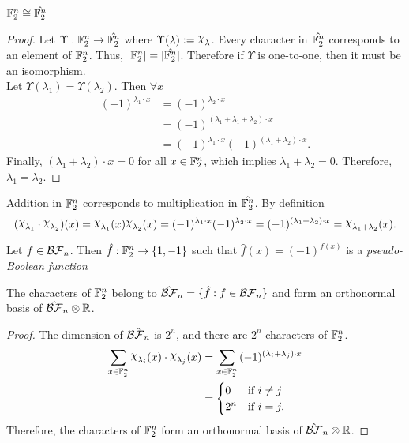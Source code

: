 \begin{lemma}
  $\mathbb{F}_2^n\cong\hat{\mathbb{F}_2^n}$
\end{lemma}

\begin{proof}
  \par Let $\Upsilon:\mathbb{F}_2^n\rightarrow\hat{\mathbb{F}_2^n}$ where
  $\Upsilon(\lambda):=\Chi_\lambda$.
	Every character in $\hat{\mathbb{F}_2^n}$ corresponds to an element of
  $\mathbb{F}_2^n$. Thus, $\lvert\mathbb{F}_2^n\rvert=\lvert\hat{\mathbb{F}_2^n}\rvert$.
  Therefore if $\Upsilon$ is one-to-one, then it must be an isomorphism.\\
	Let $\Upsilon(\lambda_1)=\Upsilon(\lambda_2)$. Then $\forall x$
	\begin{align*}
		(-1)^{\lambda_1\cdot x}
      &=(-1)^{\lambda_2\cdot x}\\
		  &=(-1)^{(\lambda_1+\lambda_1+\lambda_2)\cdot x}\\
      &=(-1)^{\lambda_1\cdot x}(-1)^{(\lambda_1+\lambda_2)\cdot x}.
	\end{align*}
	Finally, $(\lambda_1+\lambda_2)\cdot x=0$ for all $x\in\mathbb{F}_2^n$, which
  implies $\lambda_1+\lambda_2=0$. Therefore, $\lambda_1=\lambda_2$.
\end{proof}

\par Addition in $\mathbb{F}_2^n$ corresponds to multiplication in
$\hat{\mathbb{F}_2^n}$. By definition
\[
(\Chi_{\lambda_1}\cdot\Chi_{\lambda_2})(x)
  =\Chi_{\lambda_1}(x)\Chi_{\lambda_2}(x)
  =(-1)^{\lambda_1\cdot x}(-1)^{\lambda_2\cdot x}
  =(-1)^{(\lambda_1+\lambda_2)\cdot x}
  =\Chi_{\lambda_1+\lambda_2}(x).
\]

\begin{definition}\label{def:pBF}
  Let $f\in\mathcal{BF}_n$. Then $\hat{f}:\mathbb{F}_2^n\rightarrow\{1,-1\}$ such that
  $\hat{f}(x)=(-1)^{f(x)}$ is a \textit{pseudo-Boolean function}
\end{definition}

\begin{lemma}
  The characters of $\mathbb{F}_2^n$ belong to $\hat{\mathcal{BF}}_n
  =\{\hat{f}:f\in\mathcal{BF}_n\}$ and form an orthonormal basis of
  $\hat{\mathcal{BF}}_n\otimes\mathbb{R}$.
\end{lemma}
\begin{proof}
  The dimension of $\hat{\mathcal{BF}_n}$ is $2^n$, and there are $2^n$ characters of
  $\mathbb{F}_2^n$.
  \begin{align*}
    \sum_{x\in\gftwo^n}{\Chi_{\lambda_i}(x)\cdot\Chi_{\lambda_j}(x)}
    &=\sum_{x\in\gftwo^n}
      {(-1)^{(\lambda_i+\lambda_j)\cdot x}}\\
    &=\begin{cases}
      0 & \text{if } i\not=j \\
      2^n & \text{if } i=j.
    \end{cases}
  \end{align*}
  Therefore, the characters of $\mathbb{F}_2^n$ form an orthonormal basis of
  $\hat{\mathcal{BF}}_n\otimes\mathbb{R}$.
\end{proof}

